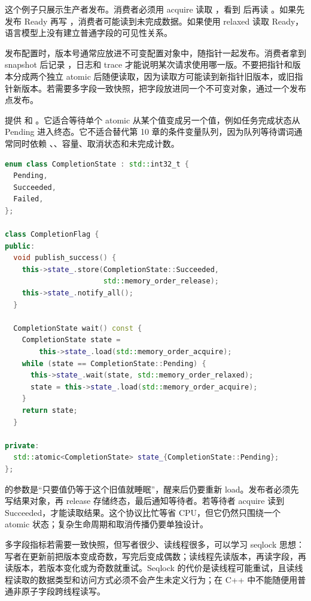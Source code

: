 这个例子只展示生产者发布。消费者必须用 acquire 读取 ，看到  后再读 。如果先发布 Ready 再写 ，消费者可能读到未完成数据。如果使用 relaxed 读取 Ready，语言模型上没有建立普通字段的可见性关系。

发布配置时，版本号通常应放进不可变配置对象中，随指针一起发布。消费者拿到 snapshot 后记录 ，日志和 trace 才能说明某次请求使用哪一版。不要把指针和版本分成两个独立 atomic 后随便读取，因为读取方可能读到新指针旧版本，或旧指针新版本。若需要多字段一致快照，把字段放进同一个不可变对象，通过一个发布点发布。

\cppTwenty 提供  和 。它适合等待单个 atomic 从某个值变成另一个值，例如任务完成状态从 Pending 进入终态。它不适合替代第 10 章的条件变量队列，因为队列等待谓词通常同时依赖 、、容量、取消状态和未完成计数。

\begin{lstlisting}[language=C++,caption={atomic wait 适合单原子状态等待}]
enum class CompletionState : std::int32_t {
  Pending,
  Succeeded,
  Failed,
};

class CompletionFlag {
public:
  void publish_success() {
    this->state_.store(CompletionState::Succeeded,
                       std::memory_order_release);
    this->state_.notify_all();
  }

  CompletionState wait() const {
    CompletionState state =
        this->state_.load(std::memory_order_acquire);
    while (state == CompletionState::Pending) {
      this->state_.wait(state, std::memory_order_relaxed);
      state = this->state_.load(std::memory_order_acquire);
    }
    return state;
  }

private:
  std::atomic<CompletionState> state_{CompletionState::Pending};
};
\end{lstlisting}

 的参数是“只要值仍等于这个旧值就睡眠”，醒来后仍要重新 load。发布者必须先写结果对象，再 release 存储终态，最后通知等待者。若等待者 acquire 读到 Succeeded，才能读取结果。这个协议比忙等省 CPU，但它仍然只围绕一个 atomic 状态；复杂生命周期和取消传播仍要单独设计。

多字段指标若需要一致快照，但写者很少、读线程很多，可以学习 seqlock 思想：写者在更新前把版本变成奇数，写完后变成偶数；读线程先读版本，再读字段，再读版本，若版本变化或为奇数就重试。Seqlock 的代价是读线程可能重试，且读线程读取的数据类型和访问方式必须不会产生未定义行为；在 C++ 中不能随便用普通非原子字段跨线程读写。

